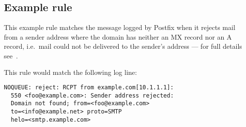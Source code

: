 \documentclass[a4paper,12pt,draft]{article}
\begin{document}
\subsection{Example rule}

This example rule matches the message logged by Postfix when it rejects
mail from a sender address where the domain has neither an MX record nor an
A record, i.e.\ mail could not be delivered to the sender's address --- for
full details see~\cite{reject-unknown-sender-domain}.

This rule would match the following log line:

\begin{verbatim}
NOQUEUE: reject: RCPT from example.com[10.1.1.1]: 
  550 <foo@example.com>: Sender address rejected:
  Domain not found; from=<foo@example.com>
  to=<info@example.net> proto=SMTP
  helo=<smtp.example.com>
\end{verbatim}
\end{document}
